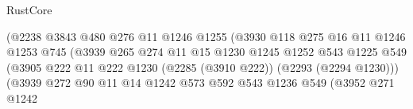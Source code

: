 \begin{lexlean}{RustCore}
\begin{coremodule}
                                            (@2238
                                              @3843
                                              @480
                                              @276
                                              @11
                                              @1246
                                              @1255
                                              (@3930
                                                @118
                                                @275
                                                @16
                                                @11
                                                @1246
                                                @1253
                                                @745
                                                (@3939
                                                  @265
                                                  @274
                                                  @11
                                                  @15
                                                  @1230
                                                  @1245
                                                  @1252
                                                  @543
                                                  @1225
                                                  @549
                                                  (@3905
                                                    @222
                                                    @11
                                                    @222
                                                    @1230
                                                    (@2285 (@3910 @222))
                                                    (@2293 (@2294 @1230)))
                                                  (@3939
                                                    @272
                                                    @90
                                                    @11
                                                    @14
                                                    @1242
                                                    @573
                                                    @592
                                                    @543
                                                    @1236
                                                    @549
                                                    (@3952
                                                      @271
                                                      @1242

\end{coremodule}
\end{lexlean}
